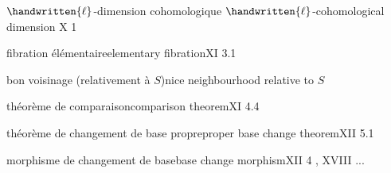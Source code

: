 $\handwritten{\ell}$-dimension cohomologique \quad $\handwritten{\ell}$-cohomological dimension \quad X 1
\margin{\handwritten{$\ell$}}

\margin{\handwritten{$\ell$}}

fibration élémentaire\quad elementary fibration\quad XI 3.1

bon voisinage (relativement à $S$)\quad nice neighbourhood relative to $S$\quad {}

théorème de comparaison\quad comparison theorem\quad XI 4.4



théorème de changement de base propre\quad proper base change theorem\quad XII 5.1

morphisme de changement de base\quad base change morphism\quad XII 4 , XVIII ...
\margin{\handwritten{*}}
